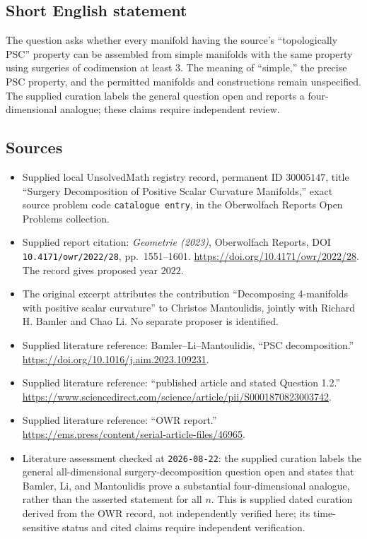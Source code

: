 \documentclass[11pt]{article}
\begin{document}
\subsection{Short English statement}
The question asks whether every manifold having the source's ``topologically PSC'' property can be assembled from simple manifolds with the same property using surgeries of codimension at least \(3\). The meaning of ``simple,'' the precise PSC property, and the permitted manifolds and constructions remain unspecified. The supplied curation labels the general question open and reports a four-dimensional analogue; these claims require independent review.
\subsection{Sources}
\begin{itemize}
\item Supplied local UnsolvedMath registry record, permanent ID \(30005147\), title ``Surgery Decomposition of Positive Scalar Curvature Manifolds,'' exact source problem code \texttt{catalogue entry}, in the Oberwolfach Reports Open Problems collection.
\item Supplied report citation: \emph{Geometrie (2023)}, Oberwolfach Reports, DOI \texttt{10.4171/owr/2022/28}, pp.\ 1551--1601. \url{https://doi.org/10.4171/owr/2022/28}. The record gives proposed year \(2022\).
\item The original excerpt attributes the contribution ``Decomposing 4-manifolds with positive scalar curvature'' to Christos Mantoulidis, jointly with Richard H. Bamler and Chao Li. No separate proposer is identified.
\item Supplied literature reference: Bamler--Li--Mantoulidis, ``PSC decomposition.'' \url{https://doi.org/10.1016/j.aim.2023.109231}.
\item Supplied literature reference: ``published article and stated Question 1.2.'' \url{https://www.sciencedirect.com/science/article/pii/S0001870823003742}.
\item Supplied literature reference: ``OWR report.'' \url{https://ems.press/content/serial-article-files/46965}.
\item Literature assessment checked at \texttt{2026-08-22}: the supplied curation labels the general all-dimensional surgery-decomposition question open and states that Bamler, Li, and Mantoulidis prove a substantial four-dimensional analogue, rather than the asserted statement for all \(n\). This is supplied dated curation derived from the OWR record, not independently verified here; its time-sensitive status and cited claims require independent verification.
\end{itemize}
\end{document}
